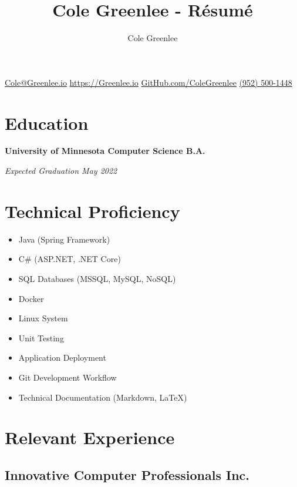\documentclass{article}
\title{Cole Greenlee - R\'esum\'e}
\author{Cole Greenlee}
\makeatletter
\renewcommand{\maketitle}{
\begin{center}
{\huge\bfseries\theauthor}
\end{center}
\begin{center}
\begin{multicols}{4}
\href{mailto:Cole@Greenlee.io}{Cole@Greenlee.io}
\href{https://Greenlee.io}{https://Greenlee.io}
\href{https://GitHub.com/ColeGreenlee/}{GitHub.com/ColeGreenlee}
\href{tel:+19525001448}{(952) 500-1448}
\end{multicols}
\end{center}
}
\makeatother
\begin{document}
\selectfont
\maketitle

\section{Education}
\begin{multicols}{2}
\begin{flushleft}
\textbf{University of Minnesota Computer Science B.A.}
\end{flushleft}
\begin{flushright}
\textit{Expected Graduation May 2022}
\end{flushright}
\end{multicols}

\section{Technical Proficiency}
\begin{multicols}{2}
\begin{itemize}[leftmargin=*]
	\item Java (Spring Framework)
	\item C\# (ASP.NET, .NET Core)
	\item SQL Databases (MSSQL, MySQL, NoSQL)
	\item Docker
	\item Linux System
	\item Unit Testing
	\item Application Deployment
	\item Git Development Workflow
	\item Technical Documentation (Markdown, LaTeX)
\end{itemize}
\end{multicols}

\section{Relevant Experience}
\subsection{Innovative Computer Professionals Inc.}
\end{document}
